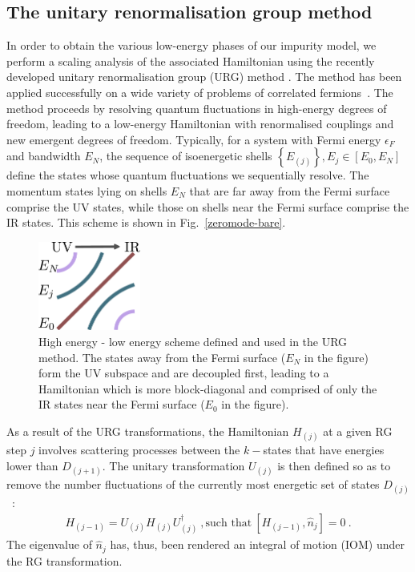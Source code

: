 \documentclass[reprint,hidelinks,onecolumn]{revtex4-2}
\begin{document}
\subsection{The unitary renormalisation group method}
In order to obtain the various low-energy phases of our impurity model, we perform a scaling analysis of the associated Hamiltonian using the recently developed unitary renormalisation group (URG) method \cite{anirbanurg1,anirbanurg2}. The method has been applied successfully on a wide variety of problems of correlated fermions~\cite{santanukagome,1dhubjhep,anirbanmott2,anirbanmott1,siddharthacpi,anirban_kondo,Patra_2023,anirbanurg1,anirbanurg2}. The method proceeds by resolving quantum fluctuations in high-energy degrees of freedom, leading to a low-energy Hamiltonian with renormalised couplings and new emergent degrees of freedom. Typically, for a system with Fermi energy \(\epsilon_F\) and bandwidth \(E_N\), the sequence of isoenergetic shells \(\left\{E_{(j)}\right\}, E_{j}\in \left[E_0, E_N\right] \) define the states whose quantum fluctuations we sequentially resolve. The momentum states lying on shells \(E_N\) that are far away from the Fermi surface comprise the UV states, while those on shells near the Fermi surface comprise the IR states. This scheme is shown in Fig.~\eqref{zeromode-bare}.

\begin{figure}[!htb]
	\includegraphics[width=0.3\textwidth]{urgScheme.pdf}
	\caption{High energy - low energy scheme defined and used in the URG method. The states away from the Fermi surface (\(E_N\) in the figure) form the UV subspace and are decoupled first, leading to a Hamiltonian which is more block-diagonal and comprised of only the IR states near the Fermi surface (\(E_0\) in the figure).}
	\label{zeromode-bare}
\end{figure}

As a result of the URG transformations, the Hamiltonian \(H_{(j)}\) at a given RG step \(j\) involves scattering processes between the \(k-\)states that have energies lower than \(D_{(j+1)}\). The unitary transformation \(U_{(j)}\) is then defined so as to remove the number fluctuations of the currently most energetic set of states \(D_{(j)}\)~\cite{anirbanurg1,anirbanurg2}:
\begin{eqnarray}
	H_{(j-1)} = U_{(j)} H_{(j)} U^\dagger_{(j)}~, \text{such that} ~\left[H_{(j-1)}, \hat n_{j}\right] =0~.
\end{eqnarray}
The eigenvalue of $\hat{n}_{j}$ has, thus, been rendered an integral of motion (IOM) under the RG transformation.
\end{document}
